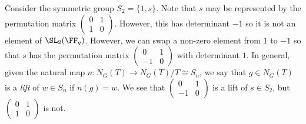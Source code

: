 \documentclass[11pt]{amsart}
\theoremstyle{remark}
\begin{document}
Consider the symmetric group $S_2 = \{1,s\}$.
Note that $s$ may be represented by the permutation matrix $\left(\begin{smallmatrix}0 & 1 \\ 1 & 0\end{smallmatrix}\right)$.
However, this has determinant $-1$ so it is not an element of $\SL_2(\FF_q)$.
However, we can swap a non-zero element from $1$ to $-1$ so that $s$ has the permutation matrix $\left(\begin{smallmatrix}0 & 1 \\ -1 & 0\end{smallmatrix}\right)$ with determinant $1$.
In general, given the natural map $n\colon N_G(T)\to N_G(T)/T\cong S_n$, we say that $g\in N_G(T)$ is a \emph{lift} of $w\in S_n$ if $n(g)=w$.
We see that $\left(\begin{smallmatrix}0 & 1 \\ -1 & 0\end{smallmatrix}\right)$ is a lift of $s\in S_2$, but $\left(\begin{smallmatrix}0 & 1 \\ 1 & 0\end{smallmatrix}\right)$ is not.
\end{document}
